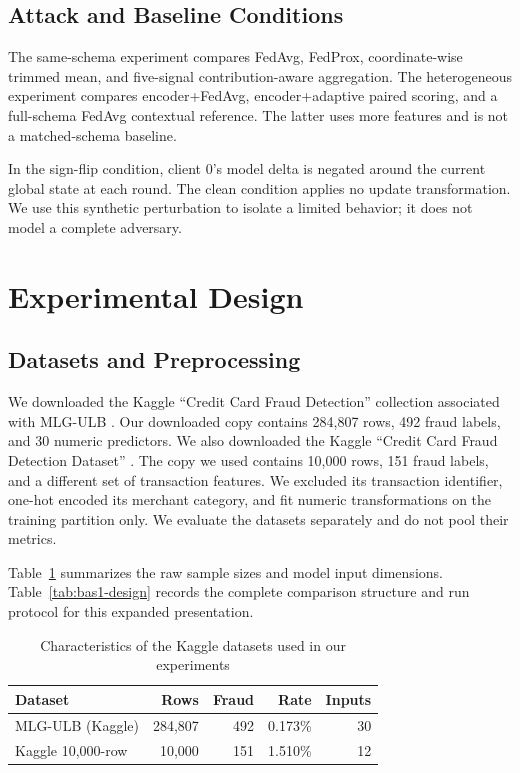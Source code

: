 \documentclass{ieeeaccess}
\begin{document}
\subsection{Attack and Baseline Conditions}
The same-schema experiment compares FedAvg, FedProx, coordinate-wise trimmed
mean, and five-signal contribution-aware aggregation. The heterogeneous
experiment compares encoder+FedAvg, encoder+adaptive paired scoring, and a
full-schema FedAvg contextual reference. The latter uses more features and is
not a matched-schema baseline.

In the sign-flip condition, client 0's model delta is negated around the
current global state at each round. The clean condition applies no update
transformation. We use this synthetic perturbation to isolate a limited behavior; it does not
model a complete adversary.

\section{Experimental Design}
\subsection{Datasets and Preprocessing}
We downloaded the Kaggle ``Credit Card Fraud Detection'' collection
associated with MLG-ULB \cite{creditcarddataset}. Our downloaded copy contains
284,807 rows, 492 fraud labels, and 30 numeric predictors. We also downloaded
the Kaggle ``Credit Card Fraud Detection Dataset'' \cite{miadul_dataset}. The
copy we used contains 10,000 rows, 151 fraud labels, and a different set of
transaction features. We excluded its transaction identifier, one-hot encoded
its merchant category, and fit numeric transformations on the training
partition only. We evaluate the datasets separately and do not pool their
metrics.

Table~\ref{tab:datasets} summarizes the raw sample sizes and model input
dimensions. Table~\ref{tab:bas1-design} records the complete comparison
structure and run protocol for this expanded presentation.
\begin{table}[t]
\caption{Characteristics of the Kaggle datasets used in our experiments}
\label{tab:datasets}
\centering
\begin{tabular}{lrrrr}
\toprule
Dataset & Rows & Fraud & Rate & Inputs \\
\midrule
MLG-ULB (Kaggle) & 284,807 & 492 & 0.173\% & 30 \\
Kaggle 10,000-row & 10,000 & 151 & 1.510\% & 12 \\
\bottomrule
\end{tabular}
\end{table}
\end{document}

